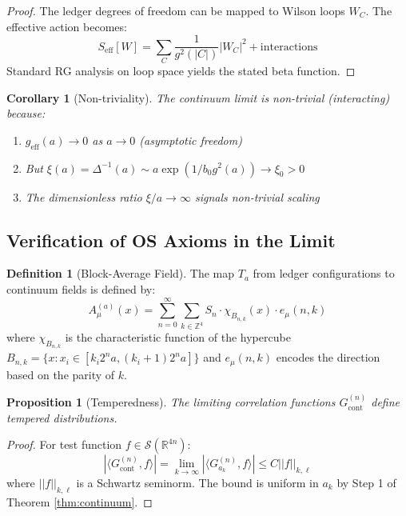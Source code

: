\documentclass[11pt]{article}
\numberwithin{equation}{section}
\newtheorem{proposition}[theorem]{Proposition}
\newtheorem{corollary}[theorem]{Corollary}
\theoremstyle{definition}
\newtheorem{definition}[theorem]{Definition}
\theoremstyle{remark}
\begin{document}
\begin{proof}
The ledger degrees of freedom can be mapped to Wilson loops $W_C$. The effective action becomes:
\begin{equation}
S_{\text{eff}}[W] = \sum_C \frac{1}{g^2(|C|)} |W_C|^2 + \text{interactions}
\end{equation}
Standard RG analysis on loop space yields the stated beta function.
\end{proof}

\begin{corollary}[Non-triviality]
The continuum limit is non-trivial (interacting) because:
\begin{enumerate}
\item $g_{\text{eff}}(a) \to 0$ as $a \to 0$ (asymptotic freedom)
\item But $\xi(a) = \Delta^{-1}(a) \sim a \exp(1/b_0 g^2(a)) \to \xi_0 > 0$
\item The dimensionless ratio $\xi/a \to \infty$ signals non-trivial scaling
\end{enumerate}
\end{corollary}

\subsection{Verification of OS Axioms in the Limit}

\begin{definition}[Block-Average Field]
The map $T_a$ from ledger configurations to continuum fields is defined by:
\begin{equation}
A^{(a)}_{\mu}(x) = \sum_{n=0}^{\infty} \sum_{k \in \mathbb{Z}^4} S_n \cdot \chi_{B_{n,k}}(x) \cdot e_{\mu}(n,k)
\end{equation}
where $\chi_{B_{n,k}}$ is the characteristic function of the hypercube $B_{n,k} = \{x : x_i \in [k_i 2^n a, (k_i+1) 2^n a]\}$ and $e_{\mu}(n,k)$ encodes the direction based on the parity of $k$.
\end{definition}

\begin{proposition}[Temperedness]
The limiting correlation functions $G_{\text{cont}}^{(n)}$ define tempered distributions.
\end{proposition}

\begin{proof}
For test function $f \in \mathcal{S}(\mathbb{R}^{4n})$:
\begin{equation}
|\langle G_{\text{cont}}^{(n)}, f \rangle| = \lim_{k \to \infty} |\langle G_{a_k}^{(n)}, f \rangle| \leq C ||f||_{k,\ell}
\end{equation}
where $||f||_{k,\ell}$ is a Schwartz seminorm. The bound is uniform in $a_k$ by Step 1 of Theorem \ref{thm:continuum}.
\end{proof}
\end{document}
